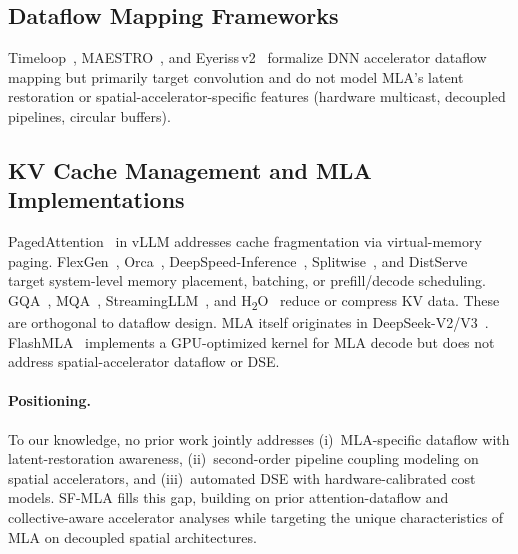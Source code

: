 \documentclass[sigconf, review, anonymous]{acmart}
\newcommand{\brand}{SF-MLA}
\newcommand{\sysname}{\textsc{\brand}\xspace}
\begin{document}

\subsection{Dataflow Mapping Frameworks}\label{sec:rw-framework}

Timeloop~\cite{parashar2019timeloop},
MAESTRO~\cite{kwon2019maestro}, and Eyeriss\,v2~\cite{chen2019eyerissv2}
formalize DNN accelerator dataflow mapping but primarily target
convolution and do not model MLA's latent restoration or
spatial-accelerator-specific features (hardware multicast, decoupled
pipelines, circular buffers).



\subsection{KV Cache Management and MLA Implementations}\label{sec:rw-kv}

PagedAttention~\cite{kwon2023pagedattention} in vLLM addresses cache
fragmentation via virtual-memory paging.  FlexGen~\cite{sheng2023flexgen},
Orca~\cite{yu2022orca}, DeepSpeed-Inference~\cite{aminabadi2022deepspeed},
Splitwise~\cite{patel2024splitwise}, and
DistServe~\cite{zhong2024distserve} target system-level memory
placement, batching, or prefill/decode scheduling.
GQA~\cite{ainslie2023gqa}, MQA~\cite{shazeer2019mqa},
StreamingLLM~\cite{xiao2024streamingllm}, and
H\textsubscript{2}O~\cite{zhang2024h2o} reduce or compress KV data.
These are orthogonal to dataflow design.
MLA itself originates in DeepSeek-V2/V3~\cite{deepseekai2024deepseekv2,
deepseekai2024deepseekv3}.  FlashMLA~\cite{flashmla2024gpu} implements a GPU-optimized kernel
for MLA decode but does not address spatial-accelerator dataflow or DSE.

\paragraph{Positioning.}
To our knowledge, no prior work jointly addresses (i)~MLA-specific
dataflow with latent-restoration awareness, (ii)~second-order pipeline
coupling modeling on spatial accelerators, and (iii)~automated DSE
with hardware-calibrated cost models.
\sysname fills this gap, building on prior attention-dataflow and
collective-aware accelerator analyses while targeting the unique
characteristics of MLA on decoupled spatial architectures.


\end{document}
